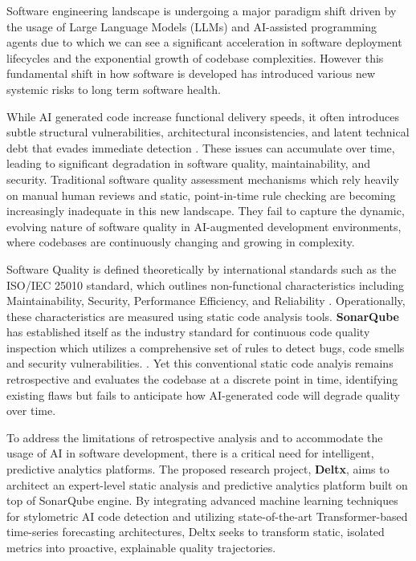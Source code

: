 Software engineering landscape is undergoing a major paradigm shift driven by the usage of Large Language Models (LLMs) and AI-assisted programming agents due to which we can see a significant acceleration in software deployment lifecycles and the exponential growth of codebase complexities. However this fundamental shift in how software is developed has introduced various new systemic risks to long term software health.

While AI generated code increase functional delivery speeds, it often introduces subtle structural vulnerabilities, architectural inconsistencies, and latent technical debt that evades immediate detection \parencite{human_written_vs_ai_generated_code_2025}. These issues can accumulate over time, leading to significant degradation in software quality, maintainability, and security. Traditional software quality assessment mechanisms which rely heavily on manual human reviews and static, point-in-time rule checking are becoming increasingly inadequate in this new landscape. They fail to capture the dynamic, evolving nature of software quality in AI-augmented development environments, where codebases are continuously changing and growing in complexity.

Software Quality is defined theoretically by international standards such as the ISO/IEC 25010 standard, which outlines non-functional characteristics including Maintainability, Security, Performance Efficiency, and Reliability \parencite{isoiec25010}. Operationally, these characteristics are measured using static code analysis tools. \textbf{SonarQube} has established itself as the industry standard for continuous code quality inspection which utilizes a comprehensive set of rules to detect bugs, code smells and security vulnerabilities. \parencite{sonarqube_metrics_definition}. Yet this conventional static code analyis remains retrospective and evaluates the codebase at a discrete point in time, identifying existing flaws but fails to anticipate how AI-generated code will degrade quality over time.

To address the limitations of retrospective analysis and to accommodate  the usage of AI in software development, there is a critical need for intelligent, predictive analytics platforms. The proposed research project, \textbf{Deltx}, aims to architect an expert-level static analysis and predictive analytics platform built on top of SonarQube engine. By integrating advanced machine learning techniques for stylometric AI code detection and utilizing state-of-the-art Transformer-based time-series forecasting architectures, Deltx seeks to transform static, isolated metrics into proactive, explainable quality trajectories.


